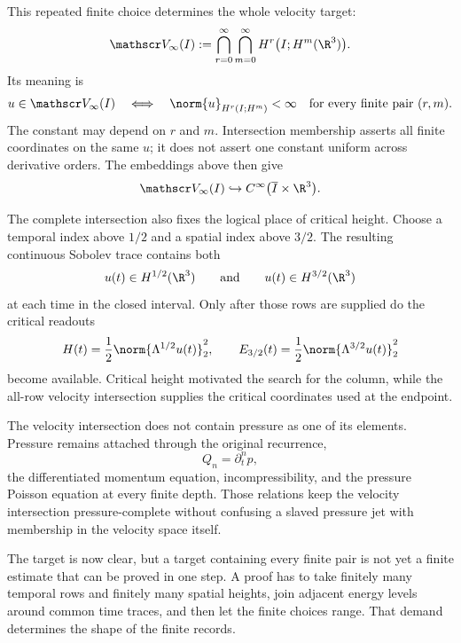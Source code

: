 This repeated finite choice determines the whole velocity target:
\[
  \mathscr V_\infty(I)
  :=
  \bigcap_{r=0}^{\infty}
  \bigcap_{m=0}^{\infty}
  H^r\bigl(I;H^m(\R^3)\bigr).
\]
Its meaning is
\[
  u\in\mathscr V_\infty(I)
  \quad\Longleftrightarrow\quad
  \norm{u}_{H^r(I;H^m)}
  <
  \infty
  \quad
  \text{for every finite pair }(r,m).
\]
The constant may depend on \(r\) and \(m\).
Intersection membership asserts all finite coordinates on the same \(u\); it does not assert one constant uniform across derivative orders.
The embeddings above then give
\[
  \mathscr V_\infty(I)
  \hookrightarrow
  C^\infty\bigl(\overline I\times\R^3\bigr).
\]

The complete intersection also fixes the logical place of critical height.
Choose a temporal index above \(1/2\) and a spatial index above \(3/2\).
The resulting continuous Sobolev trace contains both
\[
  u(t)\in H^{1/2}(\R^3)
  \qquad\text{and}\qquad
  u(t)\in H^{3/2}(\R^3)
\]
at each time in the closed interval.
Only after those rows are supplied do the critical readouts
\[
  H(t)=\frac12\norm{\Lambda^{1/2}u(t)}_2^2,
  \qquad
  E_{3/2}(t)=\frac12\norm{\Lambda^{3/2}u(t)}_2^2
\]
become available.
Critical height motivated the search for the column, while the all-row velocity intersection supplies the critical coordinates used at the endpoint.

The velocity intersection does not contain pressure as one of its elements.
Pressure remains attached through the original recurrence,
\[
  Q_n=\partial_t^np,
\]
the differentiated momentum equation, incompressibility, and the pressure Poisson equation at every finite depth.
Those relations keep the velocity intersection pressure-complete without confusing a slaved pressure jet with membership in the velocity space itself.

The target is now clear, but a target containing every finite pair is not yet a finite estimate that can be proved in one step.
A proof has to take finitely many temporal rows and finitely many spatial heights, join adjacent energy levels around common time traces, and then let the finite choices range.
That demand determines the shape of the finite records.
